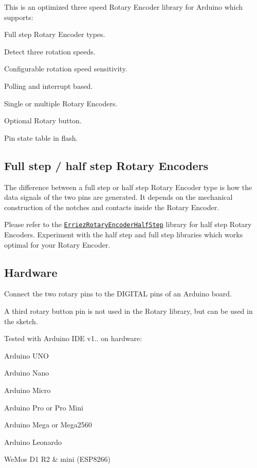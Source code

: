 \href{https://travis-ci.org/Erriez/ErriezRotaryEncoderFullStep}{\tt }

This is an optimized three speed Rotary Encoder library for Arduino which supports\+:


\begin{DoxyItemize}
\item Full step Rotary Encoder types.
\item Detect three rotation speeds.
\item Configurable rotation speed sensitivity.
\item Polling and interrupt based.
\item Single or multiple Rotary Encoders.
\item Optional Rotary button.
\item Pin state table in flash.
\end{DoxyItemize}



\subsection*{Full step / half step Rotary Encoders}

The difference between a full step or half step Rotary Encoder type is how the data signals of the two pins are generated. It depends on the mechanical construction of the notches and contacts inside the Rotary Encoder.

Please refer to the \href{https://github.com/Erriez/ErriezRotaryEncoderHalfStep}{\tt Erriez\+Rotary\+Encoder\+Half\+Step} library for half step Rotary Encoders. Experiment with the half step and full step libraries which works optimal for your Rotary Encoder.

\subsection*{Hardware}

Connect the two rotary pins to the D\+I\+G\+I\+T\+AL pins of an Arduino board.

A third rotary button pin is not used in the Rotary library, but can be used in the sketch.

Tested with Arduino I\+DE v1.. on hardware\+:


\begin{DoxyItemize}
\item Arduino U\+NO
\item Arduino Nano
\item Arduino Micro
\item Arduino Pro or Pro Mini
\item Arduino Mega or Mega2560
\item Arduino Leonardo
\item We\+Mos D1 R2 \& mini (E\+S\+P8266)
\end{DoxyItemize}

